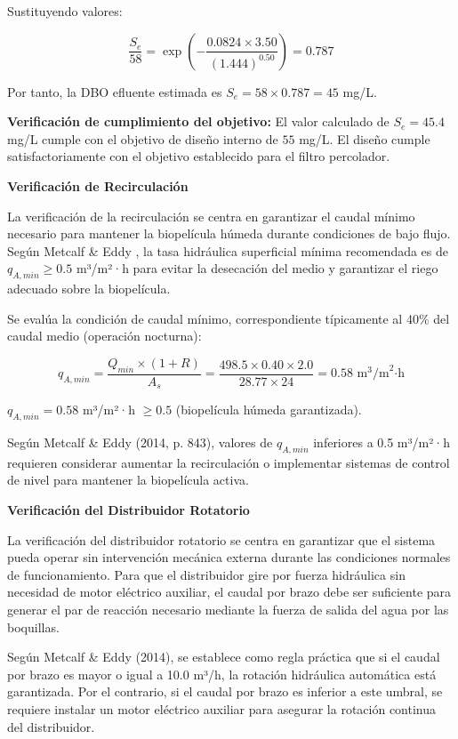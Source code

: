 \documentclass[12pt,a4paper]{article}
\begin{document}
Sustituyendo valores:

\begin{equation}
\frac{S_e}{58} = \exp\left(-\frac{0.0824 \times 3.50}{(1.444)^{0.50}}\right) = 0.787
\end{equation}

Por tanto, la DBO efluente estimada es $S_e = 58 \times 0.787 = 45$ mg/L.

\textbf{Verificación de cumplimiento del objetivo:} El valor calculado de $S_e = 45.4$ mg/L cumple con el objetivo de diseño interno de $55$ mg/L. El diseño cumple satisfactoriamente con el objetivo establecido para el filtro percolador.

\textbf{Verificación de Recirculación}

La verificación de la recirculación se centra en garantizar el caudal mínimo necesario para mantener la biopelícula húmeda durante condiciones de bajo flujo. Según Metcalf \& Eddy \cite{metcalf2014}, la tasa hidráulica superficial mínima recomendada es de $q_{A,min} \geq 0.5$ m³/m²·h para evitar la desecación del medio y garantizar el riego adecuado sobre la biopelícula.

Se evalúa la condición de caudal mínimo, correspondiente típicamente al 40\% del caudal medio (operación nocturna):

\begin{equation}
q_{A,min} = \frac{Q_{min} \times (1 + R)}{A_s} = \frac{498.5 \times 0.40 \times 2.0}{28.77 \times 24} = 0.58 \text{ m}^3\text{/m}^2\text{·h}
\end{equation}

$q_{A,min} = 0.58$ m³/m²·h $\geq 0.5$ (biopelícula húmeda garantizada).

Según Metcalf \& Eddy (2014, p. 843), valores de $q_{A,min}$ inferiores a 0.5 m³/m²·h requieren considerar aumentar la recirculación o implementar sistemas de control de nivel para mantener la biopelícula activa.

\textbf{Verificación del Distribuidor Rotatorio}

La verificación del distribuidor rotatorio se centra en garantizar que el sistema pueda operar sin intervención mecánica externa durante las condiciones normales de funcionamiento. Para que el distribuidor gire por fuerza hidráulica sin necesidad de motor eléctrico auxiliar, el caudal por brazo debe ser suficiente para generar el par de reacción necesario mediante la fuerza de salida del agua por las boquillas.

Según Metcalf \& Eddy (2014), se establece como regla práctica que si el caudal por brazo es mayor o igual a 10.0 m³/h, la rotación hidráulica automática está garantizada. Por el contrario, si el caudal por brazo es inferior a este umbral, se requiere instalar un motor eléctrico auxiliar para asegurar la rotación continua del distribuidor.
\end{document}

